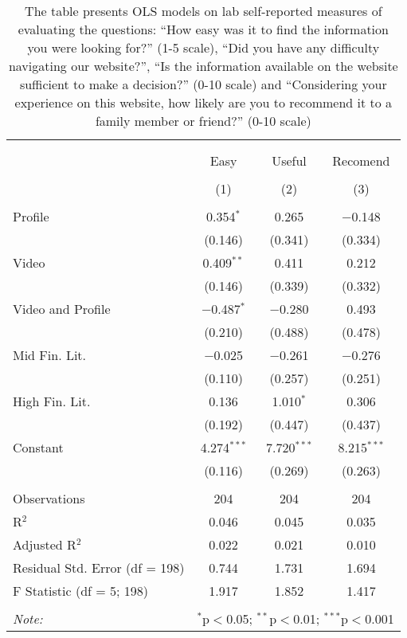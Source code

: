 
\begin{table}[H] \centering 
  \caption{The table presents OLS models on lab self-reported measures of evaluating the questions: 
            ``How easy was it to find the information you were looking for?'' (1-5 scale), 
            ``Did you have any difficulty navigating our website?'', 
            ``Is the information available on the website sufficient to make a decision?'' (0-10 scale) and ``Considering your experience on this website, how likely are you to recommend it to a family member or friend?'' (0-10 scale)
          } 
  \label{tbl:self_reported_lab} 
\begin{tabular}{@{\extracolsep{5pt}}lccc} 
\\[-1.8ex]\hline 
\hline \\[-1.8ex] 
\\[-1.8ex] & Easy & Useful & Recomend \\ 
\\[-1.8ex] & (1) & (2) & (3)\\ 
\hline \\[-1.8ex] 
 Profile & 0.354$^{*}$ & 0.265 & $-$0.148 \\ 
  & (0.146) & (0.341) & (0.334) \\ 
  Video & 0.409$^{**}$ & 0.411 & 0.212 \\ 
  & (0.146) & (0.339) & (0.332) \\ 
  Video and Profile & $-$0.487$^{*}$ & $-$0.280 & 0.493 \\ 
  & (0.210) & (0.488) & (0.478) \\ 
  Mid Fin. Lit. & $-$0.025 & $-$0.261 & $-$0.276 \\ 
  & (0.110) & (0.257) & (0.251) \\ 
  High Fin. Lit. & 0.136 & 1.010$^{*}$ & 0.306 \\ 
  & (0.192) & (0.447) & (0.437) \\ 
  Constant & 4.274$^{***}$ & 7.720$^{***}$ & 8.215$^{***}$ \\ 
  & (0.116) & (0.269) & (0.263) \\ 
 \hline \\[-1.8ex] 
Observations & 204 & 204 & 204 \\ 
R$^{2}$ & 0.046 & 0.045 & 0.035 \\ 
Adjusted R$^{2}$ & 0.022 & 0.021 & 0.010 \\ 
Residual Std. Error (df = 198) & 0.744 & 1.731 & 1.694 \\ 
F Statistic (df = 5; 198) & 1.917 & 1.852 & 1.417 \\ 
\hline 
\hline \\[-1.8ex] 
\textit{Note:}  & \multicolumn{3}{l}{$^{*}$p$<$0.05; $^{**}$p$<$0.01; $^{***}$p$<$0.001} \\ 
\end{tabular} 
\end{table} 

